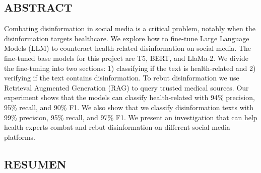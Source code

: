 



\vspace*{0.5in}
\begin{center}
\section*{ABSTRACT}
\end{center}

\noindent
Combating disinformation in social media is a critical problem, notably when the disinformation targets healthcare. We explore how to fine-tune Large Language Models (LLM) to counteract health-related disinformation on social media. The fine-tuned base models for this project are T5, BERT, and LlaMa-2. We divide the fine-tuning into two sections: 1) classifying if the text is health-related and 2) verifying if the text contains disinformation. To rebut disinformation we use Retrieval Augmented Generation (RAG) to query trusted medical sources. Our experiment shows that the models can classify health-related with 94\% precision, 95\% recall, and 90\% F1. We also show that we classify disinformation texts with 99\% precision, 95\% recall, and 97\% F1. We present an investigation that can help health experts combat and rebut disinformation on different social media platforms.






\newpage





\vspace*{0.5in}
\begin{center}
\section*{RESUMEN}
\end{center}

